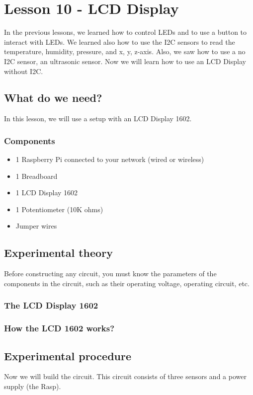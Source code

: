 \documentclass[10pt,twoside,english]{_support/latex/sbabook/sbabook}
\begin{document}
\frontmatter
\pagestyle{plain}

\tableofcontents*
\clearpage\listoffigures

\mainmatter

\chapter{Lesson 10 - LCD Display}
In the previous lessons, we learned how to control LEDs and to use a button to interact with LEDs. We learned also how to use the I2C sensors to read the temperature, humidity, pressure, and x, y, z-axis. Also, we saw how to use a no I2C sensor, an ultrasonic sensor. Now we will learn how to use an LCD Display without I2C. 
\section{What do we need?}
In this lesson, we will use a setup with an LCD Display 1602.
\subsection{Components}
\begin{itemize}
\item 1 Raspberry Pi connected to your network (wired or wireless)
\item 1 Breadboard
\item 1 LCD Display 1602 
\item 1 Potentiometer (10K ohms)
\item Jumper wires
\end{itemize}
\section{Experimental theory}
Before constructing any circuit, you must know the parameters of the components in the circuit, such as their operating voltage, operating circuit, etc.
\subsection{The LCD Display 1602}\subsection{How the LCD 1602 works?}\section{Experimental procedure}
Now we will build the circuit. This circuit consists of three sensors and a power supply (the Rasp).
\end{document}
